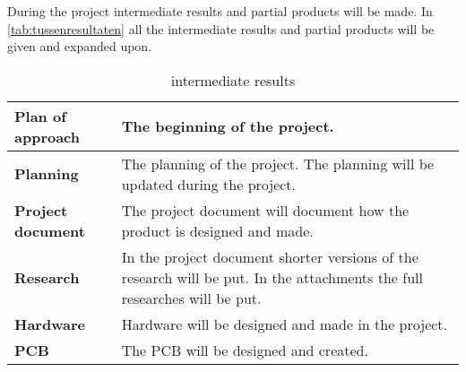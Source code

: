During the project intermediate results and partial products will be made. In \autoref{tab:tussenresultaten} all the intermediate results and partial products will be given and expanded upon.

\begin{table}[H]
    \centering
    \begin{tabular}{l | p{10cm}}
         \bf Plan of approach & The beginning of the project. \\\hline
         \bf Planning & The planning of the project. The planning will be updated during the project.  \\\hline
         \bf Project document & The project document will document how the product is designed and made. \\\hline 
         \bf Research & In the project document shorter versions of the research will be put. In the attachments the full researches will be put.\\\hline
         \bf Hardware & Hardware will be designed and made in the project. \\\hline
         \bf PCB & The PCB will be designed and created.\\
    \end{tabular}
    \caption{intermediate results}
    \label{tab:tussenresultaten}
\end{table}